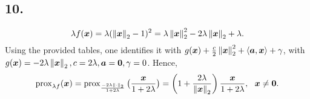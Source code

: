 \subsection{10.}
%
\begin{equation*}
    \lambda f(\boldsymbol x) = \lambda (\left\lVert\boldsymbol x\right\rVert_{2}-1)^2 
    = \lambda \left\lVert\boldsymbol x\right\rVert_{2}^2
    - 2 \lambda \left\lVert\boldsymbol x\right\rVert_{2} + \lambda.
\end{equation*}
%
Using the provided tables, one identifies it with 
$g(\boldsymbol x) + \frac{c}{2} \left\lVert\boldsymbol x\right\rVert_{2}^2 + \langle \boldsymbol a, \boldsymbol x \rangle
+ \gamma$, with $g(\boldsymbol x) = -2\lambda\left\lVert\boldsymbol x\right\rVert_{2}, c=2\lambda,
\boldsymbol a=\boldsymbol 0, \gamma=0$.
Hence,
%
\begin{equation*}
    \operatorname{prox}_{\lambda f}(\boldsymbol x) = 
    \operatorname{prox}_{\frac{-2\lambda\left\lVert\cdot\right\rVert_{2}}{1+2\lambda}}
    \big(\frac{\boldsymbol x}{1+2\lambda} \big) = 
    \left( 1+ \frac{2\lambda}{\left\lVert\boldsymbol x\right\rVert_{2}} 
    \right) \frac{\boldsymbol x}{1+2\lambda},~~\boldsymbol x \neq \boldsymbol 0.
\end{equation*}
